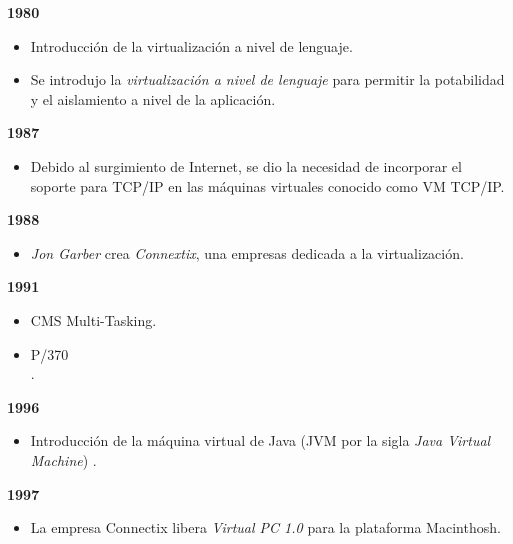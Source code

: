 \textbf{1980}\\
\begin{itemize}
	\item Introducción de la virtualización a nivel de lenguaje.\\
	
	\item Se introdujo la \textit{virtualización a nivel de lenguaje} para permitir la potabilidad y el aislamiento a nivel de la aplicación\parencite{Douglis2013}. \\ 
\end{itemize}

\textbf{1987}\\
\begin{itemize}
	\item Debido al surgimiento de Internet, se dio la necesidad de incorporar el soporte para TCP/IP en las máquinas virtuales conocido como VM TCP/IP.\\
\end{itemize}

\textbf{1988}\\
\begin{itemize}
	\item \textit{Jon Garber} crea \textit{Connextix},  una empresas dedicada a la virtualización.\\
\end{itemize}


\textbf{1991}\\
\begin{itemize}
	\item CMS Multi-Tasking.\\
	
	\item P/370 \\.
\end{itemize}


\textbf{1996}\\
\begin{itemize}
	\item Introducción de la máquina virtual de Java (JVM por la sigla \textit{Java Virtual Machine}) \parencite{Lindholm1997,Douglis2013}. \\
\end{itemize}


\textbf{1997}\\
\begin{itemize}
	\item La empresa Connectix libera \textit{Virtual PC 1.0} para la plataforma Macinthosh. \\
\end{itemize}
				

